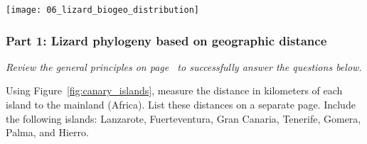 \documentclass[12pt, hidelinks]{exam}
\begin{document}
\begin{center}

	\texttt{[image: 06\_lizard\_biogeo\_distribution]}
	

\end{center}

\subsubsection*{Part 1: Lizard phylogeny based on geographic distance}

\textit{Review the general principles on page~\pageref{general_principles} to successfully answer the questions below.}
	
Using Figure~\ref{fig:canary_islands}, measure the distance in kilometers of each island to the mainland (Africa). List these distances on a separate page. Include the following islands: Lanzarote, Fuerteventura, Gran Canaria, Tenerife, Gomera, Palma, and Hierro.
\end{document}
